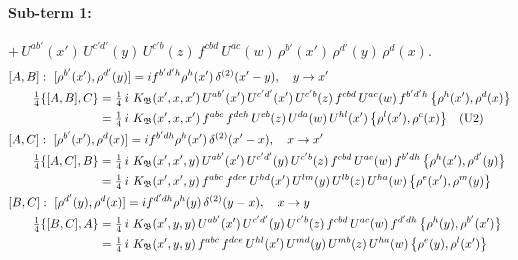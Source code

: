 \documentclass[10pt]{article}
\numberwithin{equation}{section}
\begin{document}
\paragraph{Sub-term 1:} $+\,U^{ab'}(x')\,U^{c'd'}(y)\,U^{c'b}(z)\,f^{cbd}\,U^{ac}(w)\,\rho^{b'}(x')\,\rho^{d'}(y)\,\rho^{d}(x)$.
\begin{align}
&[A,B]:\ [\rho^{b'}(x'),\rho^{d'}(y)]=i f^{b'd'h}\rho^{h}(x')\,\delta^{(2)}(x'-y),\quad y\to x'\notag\\
&\qquad \tfrac14\{[A,B],C\}=\tfrac14\,i\,\,K_{\mathfrak B}(x',x,x')\,U^{ab'}(x')\,U^{c'd'}(x')\,U^{c'b}(z)\,f^{cbd}\,U^{ac}(w)\,f^{b'd'h}\,\big\{\rho^{h}(x'),\rho^{d}(x)\big\}\notag\\
&\qquad\phantom{\tfrac14\{[A,B],C\}}=\tfrac14\,i\,\,K_{\mathfrak B}(x',x,x')\,f^{abc}\,f^{deh}\,U^{eb}(z)\,U^{da}(w)\,U^{hl}(x')\,\big\{\rho^{l}(x'),\rho^{c}(x)\big\}\quad\text{(U2)}
\label{eq:GIII.I-1-AB}\\
&[A,C]:\ [\rho^{b'}(x'),\rho^{d}(x)]=i f^{b'dh}\rho^{h}(x')\,\delta^{(2)}(x'-x),\quad x\to x'\notag\\
&\qquad \tfrac14\{[A,C],B\}=\tfrac14\,i\,\,K_{\mathfrak B}(x',x',y)\,U^{ab'}(x')\,U^{c'd'}(y)\,U^{c'b}(z)\,f^{cbd}\,U^{ac}(w)\,f^{b'dh}\,\big\{\rho^{h}(x'),\rho^{d'}(y)\big\}\notag\\
&\qquad\phantom{\tfrac14\{[A,C],B\}}=\tfrac14\,i\,\,K_{\mathfrak B}(x',x',y)\,f^{abc}\,f^{dce}\,U^{hd}(x')\,U^{lm}(y)\,U^{lb}(z)\,U^{ha}(w)\,\big\{\rho^{e}(x'),\rho^{m}(y)\big\}
\label{eq:GIII.I-1-AC}\\
&[B,C]:\ [\rho^{d'}(y),\rho^{d}(x)]=i f^{d'dh}\rho^{h}(y)\,\delta^{(2)}(y-x),\quad x\to y\notag\\
&\qquad \tfrac14\{[B,C],A\}=\tfrac14\,i\,\,K_{\mathfrak B}(x',y,y)\,U^{ab'}(x')\,U^{c'd'}(y)\,U^{c'b}(z)\,f^{cbd}\,U^{ac}(w)\,f^{d'dh}\,\big\{\rho^{h}(y),\rho^{b'}(x')\big\}\notag\\
&\qquad\phantom{\tfrac14\{[B,C],A\}}=\tfrac14\,i\,\,K_{\mathfrak B}(x',y,y)\,f^{abc}\,f^{dce}\,U^{hl}(x')\,U^{md}(y)\,U^{mb}(z)\,U^{ha}(w)\,\big\{\rho^{e}(y),\rho^{l}(x')\big\}
\label{eq:GIII.I-1-BC}
\end{align}
\end{document}

